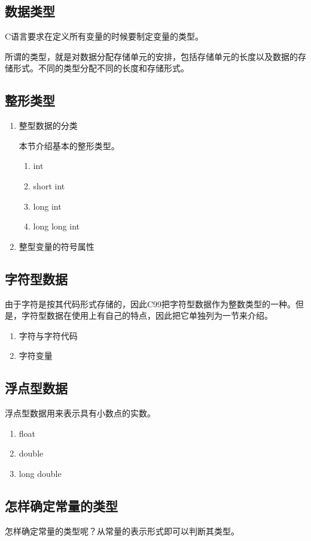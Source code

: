 \subsection{数据类型}
C语言要求在定义所有变量的时候要制定变量的类型。

所谓的类型，就是对数据分配存储单元的安排，包括存储单元的长度以及数据的存储形式。不同的类型分配不同的长度和存储形式。

\subsection{整形类型}
\begin{enumerate}
	\item 整型数据的分类

		本节介绍基本的整形类型。
		
		\begin{enumerate}
			\item int
			\item short int
			\item long int
			\item long long int
		\end{enumerate}
	\item 整型变量的符号属性
\end{enumerate}
\subsection{字符型数据}
由于字符是按其代码形式存储的，因此C99把字符型数据作为整数类型的一种。但是，字符型数据在使用上有自己的特点，因此把它单独列为一节来介绍。
\begin{enumerate}
	\item 字符与字符代码
	\item 字符变量
\end{enumerate}
\subsection{浮点型数据}
浮点型数据用来表示具有小数点的实数。
\begin{enumerate}
	\item float
	\item double
	\item long double
\end{enumerate}
\subsection{怎样确定常量的类型}
怎样确定常量的类型呢？从常量的表示形式即可以判断其类型。

